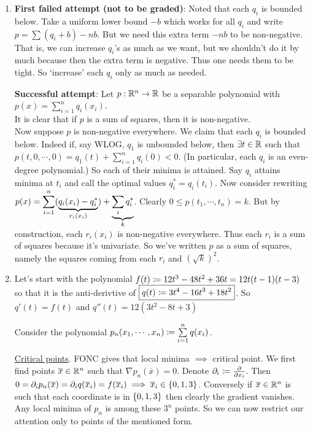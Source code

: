 \begin{enumerate}[label=(\alph*)]
\item {\color{gray}\textbf{First failed attempt (not to be graded)}: Noted that each $q_{i}$ is bounded below. Take a uniform lower bound $-b$ which works for all $q_{i}$ and write $p = \sum(q_{i}+b) - nb$. But we need this extra term $-nb$ to be non-negative. That is, we can increase $q_{i}$'s as much as we want, but we shouldn't do it by much because then the extra term is negative. Thus one needs them to be tight. So `increase' each $q_{i}$ only as much as needed.}

\textbf{Successful attempt}: Let $p:\mathbb{R}^{n}\to\mathbb{R}$ be a separable polynomial with $p(x) = \sum\limits_{i=1}^{n}q_{i}(x_{i})$. \\
It is clear that if $p$ is a sum of squares, then it is non-negative.\\
Now suppose $p$ is non-negative everywhere. We claim that each $q_{i}$ is bounded below. Indeed if, say WLOG, $q_{1}$ is unbounded below, then $\exists t\in\mathbb{R}$ such that $p(t,0,\cdots,0) = q_{1}(t) + \sum_{i=1}^{n}q_{i}(0) < 0$. (In particular, each $q_{i}$ is an even-degree polynomial.) So each of their minima is attained. Say $q_{i}$ attains minima at $t_{i}$ and call the optimal values $q_{i}^{*}=q_{i}(t_{i})$. Now consider rewriting $\displaystyle p(x) = \sum_{i=1}^{n}(\underbrace{q_{i}(x_{i})-q_{i}^{*}}_{r_{i}(x_{i})}) + \underbrace{\sum_{i}q_{i}^{*}}_{k}$. Clearly $0 \le p(t_{1},\cdots,t_{n}) = k$. But by construction, each $r_{i}(x_{i})$ is non-negative everywhere. Thus each $r_{i}$ is a sum of squares because it's univariate. So we've written $p$ as a sum of squares, namely the squares coming from each $r_{i}$ and $\left(\sqrt{k}\right)^{2}$.

\item Let's start with the polynomial $f(t) \coloneqq 12t^{3} - 48t^{2} + 36t = 12t(t-1)(t-3)$ so that it is the anti-derivtive of $\boxed{q(t) \coloneqq 3t^{4}-16t^{3}+18t^{2}}$. So $q'(t) = f(t)$ and $q''(t) = 12(3t^{2}-8t+3)$

Consider the polynomial $p_{n}(x_{1},\cdots,x_{n}) \coloneqq \sum\limits_{i=1}^{n} q(x_{i})$. 

\underline{Critical points}. FONC gives that local minima $\implies$ critical point. We first find points $\overline x\in\mathbb{R}^{n}$ such that $\nabla p_{n}(\overline x) = 0$. Denote $\partial_{i}\coloneqq \frac{\partial}{\partial x_{i}}$. Then $0=\partial_{i}p_{n}(\overline x) =  \partial_{i}q(\overline{x}_{i}) = f(\overline x_{i})\implies \overline x_{i}\in \left\{0,1,3\right\}$. Conversely if $\overline x\in\mathbb{R}^{n}$ is such that each coordinate is in $\left\{0,1,3\right\}$ then clearly the gradient vanishes. Any local minima of $p_{n}$ is among these $3^{n}$ points. So we can now restrict our attention only to points of the mentioned form.


\end{enumerate}
